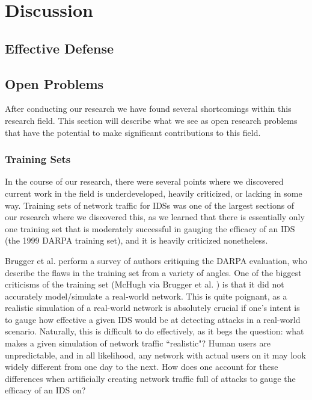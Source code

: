 \documentclass{acm_proc_article-sp}
\begin{document}
\section{Discussion}
    
    \subsection{Effective Defense}
    \subsection{Open Problems}
    After conducting our research we have found several shortcomings within this research field. This section will describe what we see as open research problems that have the potential to make significant contributions to this field.
    	\subsubsection{Training Sets} \label{trainingSets}
    	In the course of our research, there were several points where we discovered current work in the field is underdeveloped, heavily criticized, or lacking in some way. Training sets of network traffic for IDSs was one of the largest sections of our research where we discovered this, as we learned that there is essentially only one training set that is moderately successful in gauging the efficacy of an IDS (the 1999 DARPA training set), and it is heavily criticized nonetheless. 
    	
    	Brugger et al. \cite{Brugger2007} perform a survey of authors critiquing the DARPA evaluation, who describe the flaws in the training set from a variety of angles. One of the biggest criticisms of the training set (McHugh via Brugger et al. \cite{Brugger2007}) is that it did not accurately model/simulate a real-world network. This is quite poignant, as a realistic simulation of a real-world network is absolutely crucial if one's intent is to gauge how effective a given IDS would be at detecting attacks in a real-world scenario. Naturally, this is difficult to do effectively, as it begs the question: what makes a given simulation of network traffic ``realistic"? Human users are unpredictable, and in all likelihood, any network with actual users on it may look widely different from one day to the next. How does one account for these differences when artificially creating network traffic full of attacks to gauge the efficacy of an IDS on? 
    	
\end{document}

